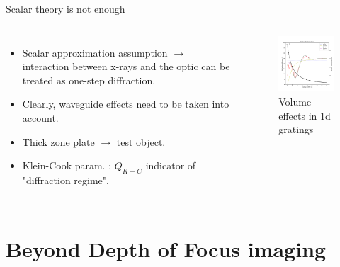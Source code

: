 \documentclass{beamer}
\begin{document}
\begin{frame}{Scalar theory is not enough}
	\begin{block}{}
		\begin{columns}[onlytextwidth,T]
			\column{\dimexpr\linewidth-30mm-10mm}
			\begin{itemize}
				\item Scalar approximation assumption $\rightarrow$ interaction between x-rays and the optic can be treated as one-step diffraction. 
				\item Clearly, waveguide effects need to be taken into account.
				\item Thick zone plate $\rightarrow$ test object.
				\item Klein-Cook param. : $Q_{K-C}$ indicator of 
				"diffraction regime"\footnotemark.
			\end{itemize}
			\column{30mm}
			\begin{figure}
				\hspace*{-1cm}\includegraphics[width=50mm]{grating}
				\caption{Volume effects in 1d gratings}
			\end{figure}
		\end{columns}
	\end{block}
\end{frame}


\section{Beyond Depth of Focus imaging}
\end{document}
